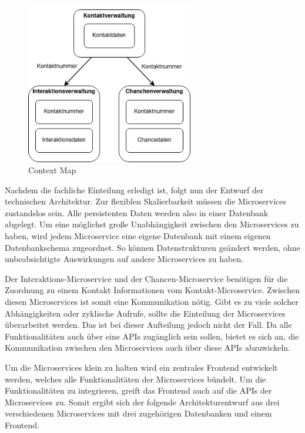 \begin{figure}[H] 
    \centering
    \includegraphics[width=0.65\textwidth]{figures/ContextMap.png}
    \caption{Context Map}
    \label{fig:CRMENTWURF}
\end{figure}

Nachdem die fachliche Einteilung erledigt ist, folgt nun der Entwurf der technischen Architektur. Zur flexiblen Skalierbarkeit müssen die Microservices zustandslos sein. Alle persistenten Daten werden also in einer Datenbank abgelegt. Um eine möglichst große Unabhängigkeit zwischen den Microservices zu haben, wird jedem Microservice eine eigene Datenbank mit einem eigenen Datenbankschema zugeordnet. So können Datenstrukturen geändert werden, ohne unbeabsichtigte Auswirkungen auf andere Microservices zu haben.

Der Interaktions-Microservice und der Chancen-Microservice benötigen für die Zuordnung zu einem Kontakt Informationen vom Kontakt-Microservice. Zwischen diesen Microservices ist somit eine Kommunikation nötig. Gibt es zu viele solcher Abhängigkeiten oder zyklische Aufrufe, sollte die Einteilung der Microservices überarbeitet werden. Das ist bei dieser Aufteilung jedoch nicht der Fall. Da alle Funktionalitäten auch über eine \acp{API} zugänglich sein sollen, bietet es sich an, die Kommunikation zwischen den Microservices auch über diese \acp{API} abzuwickeln.

Um die Microservices klein zu halten wird ein zentrales Frontend entwickelt werden, welches alle Funktionalitäten der Microservices bündelt. Um die Funktionalitäten zu integrieren, greift das Frontend auch auf die \acp{API} der Microservices zu. Somit ergibt sich der folgende Architekturentwurf aus drei verschiedenen Microservices mit drei zugehörigen Datenbanken und einem Frontend.

